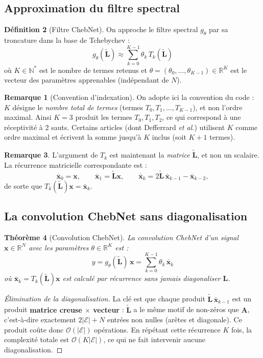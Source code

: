 \documentclass[12pt, a4paper]{article}
\newtheorem{theorem}{Théorème}[section]
\theoremstyle{definition}
\newtheorem{definition}[theorem]{Définition}
\newtheorem{remark}[theorem]{Remarque}
\newcommand{\R}{\mathbb{R}}
\newcommand{\N}{\mathbb{N}}
\newcommand{\calE}{\mathcal{E}}
\newcommand{\mat}[1]{\mathbf{#1}}
\newcommand{\A}{\mat{A}}
\newcommand{\L}{\mat{L}}
\newcommand{\Lt}{\tilde{\mat{L}}}
\newcommand{\x}{\mathbf{x}}
\begin{document}
\subsection{Approximation du filtre spectral}

\begin{definition}[Filtre ChebNet]
On approche le filtre spectral $g_\theta$ par sa troncature dans la base de Tchebychev :
\[
  \boxed{g_\theta(\Lt) \approx \sum_{k=0}^{K-1} \theta_k\, T_k(\Lt)}
\]
où $K \in \N^*$ est le nombre de termes retenus et
$\theta = (\theta_0, \ldots, \theta_{K-1}) \in \R^K$
est le vecteur des paramètres apprenables (indépendant de $N$).

\begin{remark}[Convention d'indexation]
On adopte ici la convention du code : $K$ désigne le \emph{nombre total de termes}
(termes $T_0, T_1, \ldots, T_{K-1}$), et non l'ordre maximal.
Ainsi $K = 3$ produit les termes $T_0, T_1, T_2$, ce qui correspond à une réceptivité
à 2 sauts. Certains articles (dont Defferrard \emph{et al.}) utilisent $K$ comme
ordre maximal et écrivent la somme jusqu'à $K$ inclus (soit $K+1$ termes).
\end{remark}
\end{definition}

\begin{remark}
L'argument de $T_k$ est maintenant la \emph{matrice} $\Lt$, et non un scalaire.
La récurrence matricielle correspondante est :
\[
  \bar{\x}_0 = \x, \qquad
  \bar{\x}_1 = \Lt \x, \qquad
  \bar{\x}_k = 2\Lt\, \bar{\x}_{k-1} - \bar{\x}_{k-2},
\]
de sorte que $T_k(\Lt)\x = \bar{\x}_k$.
\end{remark}

\subsection{La convolution ChebNet sans diagonalisation}

\begin{theorem}[Convolution ChebNet]
\label{thm:chebnet_conv}
La convolution ChebNet d'un signal $\x \in \R^N$ avec les paramètres $\theta \in \R^K$ est :
\[
  \boxed{y = g_\theta(\Lt)\, \x = \sum_{k=0}^{K-1} \theta_k\, \bar{\x}_k}
\]
où $\bar{\x}_k = T_k(\Lt)\x$ est calculé par récurrence sans jamais diagonaliser $\L$.
\end{theorem}

\begin{proof}[Élimination de la diagonalisation]
La clé est que chaque produit $\Lt\, \bar{\x}_{k-1}$ est un produit
\textbf{matrice creuse $\times$ vecteur} : $\Lt$ a le même motif de non-zéros que $\A$,
c'est-à-dire exactement $2|\calE| + N$ entrées non nulles (arêtes et diagonale).
Ce produit coûte donc $\mathcal{O}(|\calE|)$ opérations.
En répétant cette récurrence $K$ fois, la complexité totale est $\mathcal{O}(K|\calE|)$,
ce qui ne fait intervenir aucune diagonalisation.
\end{proof}
\end{document}
